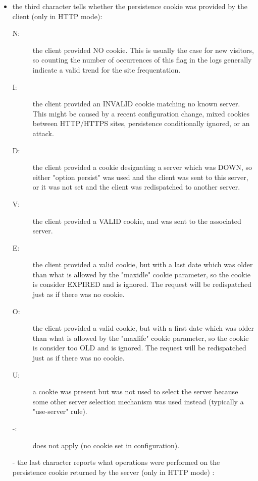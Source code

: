 \begin{itemize}
\item
    the third character tells whether the persistence cookie was provided by
    the client (only in HTTP mode):

        \begin{description}
        \item[N:]
            the client provided NO cookie. This is usually the case for new
            visitors, so counting the number of occurrences of this flag in the
            logs generally indicate a valid trend for the site frequentation.
        \item[I:]
            the client provided an INVALID cookie matching no known server.
            This might be caused by a recent configuration change, mixed
            cookies between HTTP/HTTPS sites, persistence conditionally
            ignored, or an attack.
        \item[D:]
            the client provided a cookie designating a server which was DOWN,
            so either "option persist" was used and the client was sent to
            this server, or it was not set and the client was redispatched to
            another server.
        \item[V:]
            the client provided a VALID cookie, and was sent to the associated
            server.
        \item[E:]
            the client provided a valid cookie, but with a last date which was
            older than what is allowed by the "maxidle" cookie parameter, so
            the cookie is consider EXPIRED and is ignored. The request will be
            redispatched just as if there was no cookie.
        \item[O:]
            the client provided a valid cookie, but with a first date which was
            older than what is allowed by the "maxlife" cookie parameter, so
            the cookie is consider too OLD and is ignored. The request will be
            redispatched just as if there was no cookie.
        \item[U:]
            a cookie was present but was not used to select the server because
            some other server selection mechanism was used instead (typically a
            "use-server" rule).
        \item[-:]
            does not apply (no cookie set in configuration).
        \end{description}

\item[-]
    the last character reports what operations were performed on the persistence
    cookie returned by the server (only in HTTP mode) :


\end{itemize}
